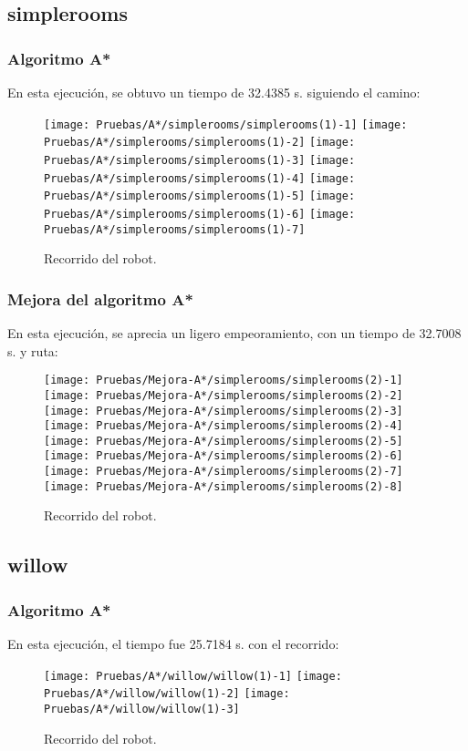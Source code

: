 \documentclass[a4paper, 11pt]{article}
\begin{document}
	\subsection{simplerooms}
		\subsubsection{Algoritmo A*}
			En esta ejecución, se obtuvo un tiempo de 32.4385 s. siguiendo el camino:
			\begin{figure}[H]
				\centering
				\texttt{[image: Pruebas/A*/simplerooms/simplerooms(1)-1]}
				\texttt{[image: Pruebas/A*/simplerooms/simplerooms(1)-2]}
				\texttt{[image: Pruebas/A*/simplerooms/simplerooms(1)-3]}
				\texttt{[image: Pruebas/A*/simplerooms/simplerooms(1)-4]}
				\texttt{[image: Pruebas/A*/simplerooms/simplerooms(1)-5]}
				\texttt{[image: Pruebas/A*/simplerooms/simplerooms(1)-6]}
				\texttt{[image: Pruebas/A*/simplerooms/simplerooms(1)-7]}
				\caption{Recorrido del robot.}
				\label{A-sim}
			\end{figure}
			
		\subsubsection{Mejora del algoritmo A*}
			En esta ejecución, se aprecia un ligero empeoramiento, con un tiempo de 32.7008 s. y ruta: 

			\begin{figure}[H]
				\centering
				\texttt{[image: Pruebas/Mejora-A*/simplerooms/simplerooms(2)-1]}
				\texttt{[image: Pruebas/Mejora-A*/simplerooms/simplerooms(2)-2]}
				\texttt{[image: Pruebas/Mejora-A*/simplerooms/simplerooms(2)-3]}
				\texttt{[image: Pruebas/Mejora-A*/simplerooms/simplerooms(2)-4]}
				\texttt{[image: Pruebas/Mejora-A*/simplerooms/simplerooms(2)-5]}
				\texttt{[image: Pruebas/Mejora-A*/simplerooms/simplerooms(2)-6]}
				\texttt{[image: Pruebas/Mejora-A*/simplerooms/simplerooms(2)-7]}
				\texttt{[image: Pruebas/Mejora-A*/simplerooms/simplerooms(2)-8]}
				\caption{Recorrido del robot.}
				\label{MA-sim}
			\end{figure}
			
	\subsection{willow}
		\subsubsection{Algoritmo A*}
			En esta ejecución, el tiempo fue 25.7184 s. con el recorrido:
			\begin{figure}[H]
				\centering
				\texttt{[image: Pruebas/A*/willow/willow(1)-1]}
				\texttt{[image: Pruebas/A*/willow/willow(1)-2]}
				\texttt{[image: Pruebas/A*/willow/willow(1)-3]}
				\caption{Recorrido del robot.}
				\label{A-wil}
			\end{figure}
			
\end{document}
